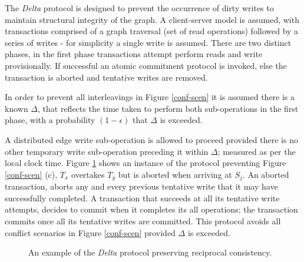\documentclass[sigplan,10pt]{acmart}
\begin{document}
The \emph{Delta} protocol is designed to prevent the occurrence of dirty writes to maintain structural integrity of the graph. A client-server model is assumed, with transactions comprised of a graph traversal (set of read operations) followed by a series of writes - for simplicity a single write is assumed. There are two distinct phases, in the first phase transactions attempt perform reads and write provisionally. If successful an atomic commitment protocol is invoked, else the transaction is aborted and tentative writes are removed.

In order to prevent all interleavings in Figure \ref{conf-scen} it is assumed there is a known $\Delta$, that reflects the time taken to perform both sub-operations in the first phase, with a probability $(1-\epsilon)$ that $\Delta$ is exceeded.

A distributed edge write sub-operation is allowed to proceed provided there is no other temporary write sub-operation preceding it within $\Delta$; measured as per the local clock time. Figure \ref{delta-abort} shows an instance of the protocol preventing Figure \ref{conf-scen} (c), $T_x$ overtakes $T_y$ but is aborted when arriving at $S_j$. An aborted transaction, aborts any and every previous tentative write that it may have successfully completed. A transaction that succeeds at all its tentative write attempts, decides to commit when it completes its all operations; the transaction commits once all its tentative writes are committed. This protocol avoids all conflict scenarios in Figure \ref{conf-scen} provided $\Delta$ is exceeded.

\begin{figure}[H]
  \centering
  \caption{An example of the \emph{Delta} protocol preserving reciprocal consistency.}
  \label{delta-abort}
\end{figure}
\end{document}
